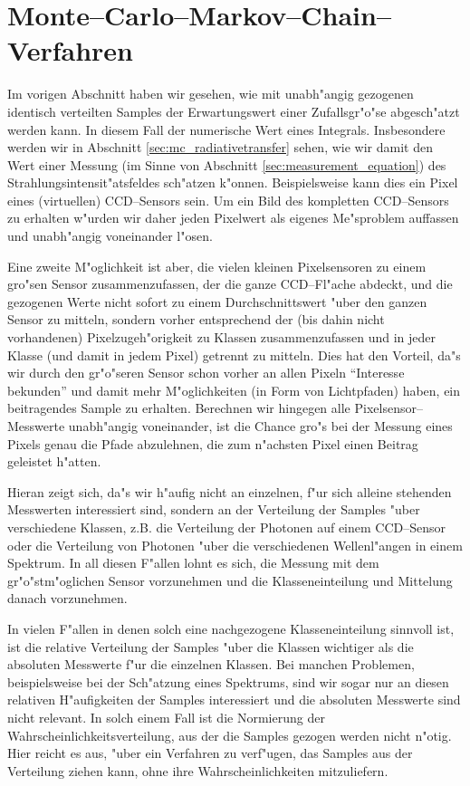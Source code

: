 	\chapter{Monte--Carlo--Markov--Chain--Verfahren}\label{chapter:mcmc}
	Im vorigen Abschnitt haben wir gesehen, wie mit unabh"angig gezogenen identisch verteilten Samples der Erwartungswert einer Zufallsgr"o"se abgesch"atzt werden kann. In diesem Fall der numerische Wert eines Integrals. Insbesondere werden wir in Abschnitt \ref{sec:mc_radiativetransfer} sehen, wie wir damit den Wert einer Messung (im Sinne von Abschnitt \ref{sec:measurement_equation}) des Strahlungsintensit"atsfeldes sch"atzen k"onnen. Beispielsweise kann dies ein Pixel eines (virtuellen) CCD--Sensors sein. Um ein Bild des kompletten CCD--Sensors zu erhalten w"urden wir daher jeden Pixelwert als eigenes Me"sproblem auffassen und unabh"angig voneinander l"osen.
	
	Eine zweite M"oglichkeit ist aber, die vielen kleinen Pixelsensoren zu einem gro"sen Sensor zusammenzufassen, der die ganze CCD--Fl"ache abdeckt, und die gezogenen Werte nicht sofort zu einem Durchschnittswert "uber den ganzen Sensor zu mitteln, sondern vorher entsprechend der (bis dahin nicht vorhandenen) Pixelzugeh"origkeit zu Klassen zusammenzufassen und in jeder Klasse (und damit in jedem Pixel) getrennt zu mitteln. Dies hat den Vorteil, da"s wir durch den gr"o"seren Sensor schon vorher an allen Pixeln ``Interesse bekunden'' und damit mehr M"oglichkeiten (in Form von Lichtpfaden) haben, ein beitragendes Sample zu erhalten. Berechnen wir hingegen alle Pixelsensor--Messwerte unabh"angig voneinander, ist die Chance gro"s bei der Messung eines Pixels genau die Pfade abzulehnen, die zum n"achsten Pixel einen Beitrag geleistet h"atten.
	
	Hieran zeigt sich, da"s wir h"aufig nicht an einzelnen, f"ur sich alleine stehenden Messwerten interessiert sind, sondern an der Verteilung der Samples "uber verschiedene Klassen, z.B. die Verteilung der Photonen auf einem CCD--Sensor oder die Verteilung von Photonen "uber die verschiedenen Wellenl"angen in einem Spektrum. In all diesen F"allen lohnt es sich, die Messung mit dem gr"o"stm"oglichen Sensor vorzunehmen und die Klasseneinteilung und Mittelung danach vorzunehmen.

	In vielen F"allen in denen solch eine nachgezogene Klasseneinteilung sinnvoll ist, ist die relative Verteilung der Samples "uber die Klassen wichtiger als die absoluten Messwerte f"ur die einzelnen Klassen. Bei manchen Problemen, beispielsweise bei der Sch"atzung eines Spektrums, sind wir sogar nur an diesen relativen H"aufigkeiten der Samples interessiert und die absoluten Messwerte sind nicht relevant. In solch einem Fall ist die Normierung der Wahrscheinlichkeitsverteilung, aus der die Samples gezogen werden nicht n"otig. Hier reicht es aus, "uber ein Verfahren zu verf"ugen, das Samples aus der Verteilung ziehen kann, ohne ihre Wahrscheinlichkeiten mitzuliefern.
	
